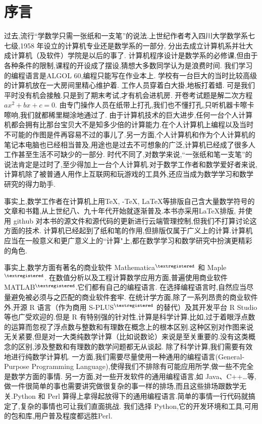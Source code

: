 %
\chapter*{序\quad 言}

\setcounter{page}{1}
\thispagestyle{empty}

过去,流行“学数学只需一张纸和一支笔”的说法.上世纪作者考入四川大学数学系七七级,1958 年设立的计算机专业还是数学系的一部分,
分出去成立计算机系并壮大成计算机（及软件）学院是以后的事了.
计算机程序设计是数学系的必修课,但由于各种条件的限制,课程的开设成了摆设,猜想大多数同学认为是浪费时间.
我们学习的编程语言是ALGOL 60,编程只能写在作业本上.
学校有一台巨大的当时比较高级的计算机放在一大房间里精心维护着.
工作人员穿着白大掛,地板打着蜡.
可是我们平时没有机会接触.只是到了期末考试,才有机会进机房.
开卷考试题是解二次方程 $ax^2+bx+c = 0$.
由专门操作人员在纸带上打孔,我们也不懂打孔,只听机器卡嚓卡嚓响,我们就都稀里糊涂地通过了.
由于计算机技术的巨大进步,任何一台个人计算机都会拥有比那台宝贝大不是知多少倍的计算能力.在个人计算机上编程以及当时不可能的作图是件再容易不过的事儿了.另一方面,个人计算机和作为个人计算机的笔记本电脑也已经相当普及,用途也是过去不可想象的广泛,计算机已经成了很多人工作甚至生活不可缺少的一部分.
时代不同了,对数学来说,“一张纸和笔一支笔”的说法肯定是过时了,至少得加上一台个人计算机.对于数学工作者和数学爱好者来说,计算机除了被普通人用作上互联网和玩游戏的工具外,还应当成为数学学习和数学研究的得力助手.

事实上,数学工作者在计算机上用\TeX, \AmS-\TeX, \LaTeX 等排版自己含大量数学符号的文章和书籍,从上世纪八、九十年代开始就逐渐普及.本书亦采用\LaTeX 排版, 并使用 github 对本书的源文件和源代码的更新进行云端管理控制,但我们不打算讨论这方面的技术.
计算机已经起到了纸和笔的作用,但排版仅属于广义上的计算.计算机应当在一般意义和更广意义上的“计算"上,都在数学学习和数学研究中扮演更精彩的角色.

事实上,数学方面有著名的商业软件 Mathematica${}^{\textregistered}$ 和 Maple${}^{\textregistered}$.
在数值分析以及工程计算数学应用方面,普遍使用商业软件 MATLAB${}^{\textregistered}$.它们都有自己的编程语言.
在选择编程语言时,自然应当尽量避免被必须与之匹配的商业软件套牢.
在统计学方面,除了一系列昂贵的商业软件外,开源 R 语言（作为商用 S-PLUS${}^{\textregistered}$ 的替代）及其开发平台 R Studio 等也广受欢迎的.但是 R 有特别强的针对性,计算是科学计算.比如,过于着眼浮点数的运算而忽视了浮点数与整数和有理数在概念上的根本区别.这种区别对作图来说无关紧要,但是对一大类纯数学计算（比如说数论）来说是至关重要的.没有这类概念的区别,涉及整数和有理数的数学问题都无从谈起.
除了科学计算,我们需要有效地进行纯数学计算机.
一方面,我们需要尽量使用一种通用的编程语言(General-Purpose Programming Language),使得我们不排除有可能应用所学,做一些不完全是数学方面的事情.
另一方面,对一些开发软件的通用编程语言,如 Java、C++…等,做一件很简单的事也需要讲究做很复杂的事一样的排场,而且这些排场跟数学无关.Python 和 Perl 算得上拿得起放得下的通用编程语言.简单的事情一行代码就搞定了,复杂的事情也可让我们直面挑战.
我们选择 Python,它的开发环境和工具,可用的包和库,用户普及程度都远胜Perl.

